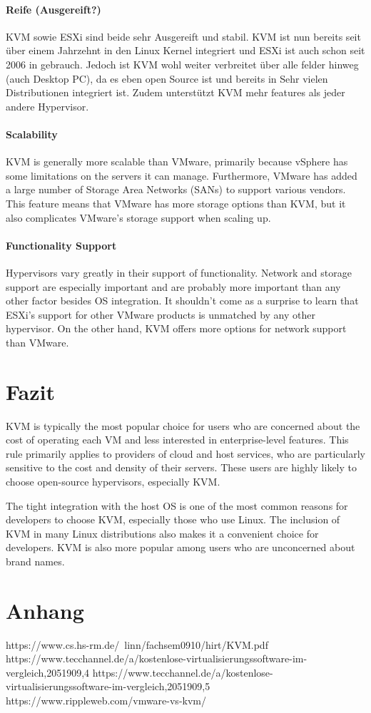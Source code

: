 \documentclass[14pt]{extreport}
\begin{document}
\subsubsection{Reife (Ausgereift?)}

KVM sowie ESXi sind beide sehr Ausgereift und stabil. KVM ist nun bereits seit über einem Jahrzehnt in den Linux Kernel integriert und ESXi ist auch schon seit 2006 in gebrauch. Jedoch ist KVM wohl weiter verbreitet über alle felder hinweg (auch Desktop PC), da es eben open Source ist und bereits in Sehr vielen Distributionen integriert ist. Zudem unterstützt KVM mehr features als jeder andere Hypervisor.

\subsubsection{Scalability}

KVM is generally more scalable than VMware, primarily because vSphere has some limitations on the servers it can manage. Furthermore, VMware has added a large number of Storage Area Networks (SANs) to support various vendors. This feature means that VMware has more storage options than KVM, but it also complicates VMware’s storage support when scaling up.
\subsubsection{Functionality Support}

Hypervisors vary greatly in their support of functionality. Network and storage support are especially important and are probably more important than any other factor besides OS integration. It shouldn’t come as a surprise to learn that ESXi’s support for other VMware products is unmatched by any other hypervisor. On the other hand, KVM offers more options for network support than VMware.

\chapter{Fazit}
KVM is typically the most popular choice for users who are concerned about the cost of operating each VM and less interested in enterprise-level features. This rule primarily applies to providers of cloud and host services, who are particularly sensitive to the cost and density of their servers. These users are highly likely to choose open-source hypervisors, especially KVM.

The tight integration with the host OS is one of the most common reasons for developers to choose KVM, especially those who use Linux. The inclusion of KVM in many Linux distributions also makes it a convenient choice for developers. KVM is also more popular among users who are unconcerned about brand names.
\chapter{Anhang}
\printbibliography

https://www.cs.hs-rm.de/~linn/fachsem0910/hirt/KVM.pdf
https://www.tecchannel.de/a/kostenlose-virtualisierungssoftware-im-vergleich,2051909,4
https://www.tecchannel.de/a/kostenlose-virtualisierungssoftware-im-vergleich,2051909,5
https://www.rippleweb.com/vmware-vs-kvm/
\end{document}
